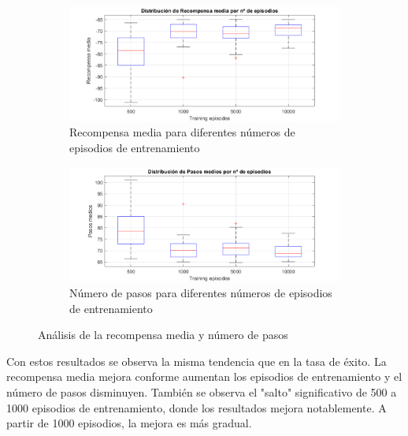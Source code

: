 \begin{figure}[H]
    \centering
    \begin{subfigure}{0.9\textwidth}
        \centering
        \includegraphics[width=\textwidth]{../../experiments/qlearning/experiment-4/results/reward.png}
        \caption{Recompensa media para diferentes números de episodios de entrenamiento}
        \label{fig:qlearning-subfig-reward}
    \end{subfigure}
    \hfill
    \begin{subfigure}{0.9\textwidth}
        \centering
        \includegraphics[width=\textwidth]{../../experiments/qlearning/experiment-4/results/steps.png}
        \caption{Número de pasos para diferentes números de episodios de entrenamiento}
        \label{fig:qlearning-subfig-steps}
    \end{subfigure}
    \caption{Análisis de la recompensa media y número de pasos}
    \label{fig:qlearning-reward}
\end{figure}

Con estos resultados se observa la misma tendencia que en la tasa de éxito. La recompensa media mejora conforme aumentan los episodios de entrenamiento y el número de pasos disminuyen. También se observa el "salto" significativo de 500 a 1000 episodios de entrenamiento, donde los resultados mejora notablemente. A partir de 1000 episodios, la mejora es más gradual. 
\\


